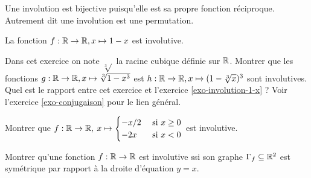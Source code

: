 \begin{remarque}
Une involution est bijective puisqu'elle est sa propre fonction réciproque. Autrement dit une involution est une permutation.
\end{remarque}

\begin{exemple}\label{exo-involution-1-x}
La fonction $f : \mathbb{R}\to \mathbb{R}, x\mapsto 1-x$ est involutive.
\end{exemple}


\begin{exercice}\label{exo-involution-cubique}
Dans cet exercice on note $\sqrt[3]{}$ la racine cubique définie sur $\mathbb{R}$.
Montrer que les fonctions $g : \mathbb{R}\to \mathbb{R}, x\mapsto \sqrt[3]{1-x^3}$ est $h : \mathbb{R}\to \mathbb{R}, x\mapsto (1-\sqrt[3]{x})^3$ sont involutives. Quel est le rapport entre cet exercice et l'exercice \ref{exo-involution-1-x} ? Voir l'exercice \ref{exo-conjugaison} pour le lien général.

\begin{center}
\hfill
{}
\end{center}
\end{exercice}

\begin{exercice}\label{exo-involution-cases}
Montrer que $f:\mathbb{R}\to \mathbb{R},\: x\mapsto \begin{cases} -x/2 & \text{ si }x\geq 0\\-2x & \text{ si }x<0\end{cases}$ est involutive.
\end{exercice}

\begin{exercice}\label{exo-involution-graphe-sym}
Montrer qu'une fonction $f:\mathbb{R}\to \mathbb{R}$ est involutive ssi son graphe $\Gamma_f \subseteq \mathbb{R}^2$ est symétrique par rapport à la droite d'équation $y=x$. 
\end{exercice}

